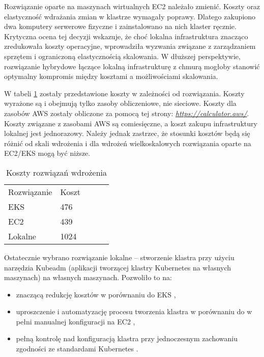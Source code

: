 \newpage

Rozwiązanie oparte na maszynach wirtualnych EC2 należało zmienić. Koszty oraz elastyczność wdrażania zmian w klastrze wymagały poprawy. Dlatego zakupiono dwa komputery serwerowe fizyczne i zainstalowano na nich klaster ręcznie. Krytyczna ocena tej decyzji wskazuje, że choć lokalna infrastruktura znacząco zredukowała koszty operacyjne, wprowadziła wyzwania związane z zarządzaniem sprzętem i ograniczoną elastycznością skalowania. W dłuższej perspektywie, rozwiązanie hybrydowe łączące lokalną infrastrukturę z chmurą mogłoby stanowić optymalny kompromis między kosztami a możliwościami skalowania.

W tabeli \ref{tab:koszty_rozwiazan_wdrazenia} zostały przedstawione koszty w zależności od rozwiązania. Koszty wyrażone są i obejmują tylko zasoby obliczeniowe, nie sieciowe. Koszty dla zasobów AWS zostały obliczone za pomocą tej strony: \textit{\url{https://calculator.aws/}}. Koszty związane z zasobami AWS są comiesięczne, a koszt zakupu infrastruktury lokalnej jest jednorazowy. Należy jednak zastrzec, że stosunki kosztów będą się różnić od skali wdrożenia i dla wdrożeń wielkoskalowych rozwiązania oparte na EC2/EKS mogą być niższe.

\begin{table}[h]
    \centering
    \begin{tabular}{|l|l|lll}
    \cline{1-2}
    Rozwiązanie & Koszt &  &  &  \\ \cline{1-2}
    EKS         & 476   &  &  &  \\ \cline{1-2}
    EC2         & 439   &  &  &  \\ \cline{1-2}
    Lokalne     & 1024  &  &  &  \\ \cline{1-2}
    \end{tabular}
    \caption{Koszty rozwiązań wdrożenia}
    \label{tab:koszty_rozwiazan_wdrazenia}
\end{table}

\vspace{0.3em}

Ostatecznie wybrano rozwiązanie lokalne – stworzenie klastra przy użyciu narzędzia Kubeadm (aplikacji tworzącej klastry Kubernetes na własnych maszynach) \cite{kubeadm_docs} na własnych maszynach. Pozwoliło to na:
\begin{itemize}
    \item znaczącą redukcję kosztów w porównaniu do EKS \cite{eks_docs},
    \item uproszczenie i automatyzację procesu tworzenia klastra w porównaniu do w pełni manualnej konfiguracji na EC2 \cite{ec2_docs},
    \item pełną kontrolę nad konfiguracją klastra przy jednoczesnym zachowaniu zgodności ze standardami Kubernetes \cite{kubernetes}.
\end{itemize}

